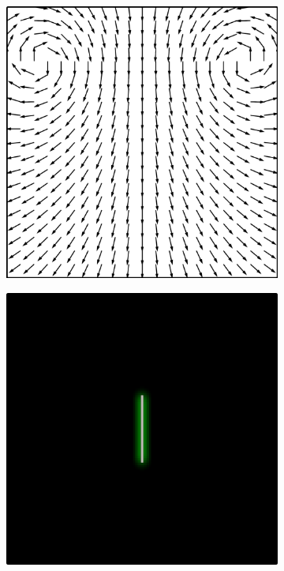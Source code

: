 \begin{figure}[t]
    \centering
    \begin{subfigure}{.24\textwidth}
        \centering
        \includegraphics[scale=.065]{figures/Coaxing/Glyphs.png}
        \caption{}
    \end{subfigure}
    \begin{subfigure}{.24\textwidth}
        \centering
        \includegraphics[scale=.065]{figures/Coaxing/SingleLine0.png}

\end{subfigure}
\end{figure}
